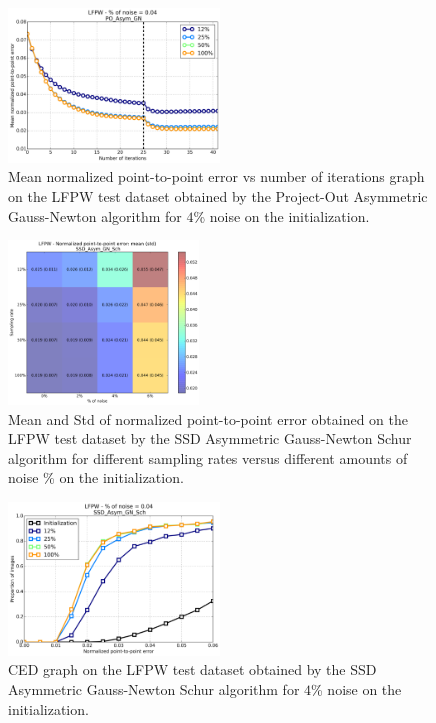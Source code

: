 \begin{figure}[h!]
    \centering
    \includegraphics[width=0.50\textwidth]{experiments/noise_vs_sampling/po_asymmetric_gn/mean_error_vs_iters_po_asymmetric_gn_4.png}
    \caption{Mean normalized point-to-point error vs number of iterations graph on the LFPW test dataset obtained by the Project-Out Asymmetric Gauss-Newton algorithm for $4$\% noise on the initialization.}
    \label{fig:mean_error_vs_iters_po_asymmetric_gn_4}
\end{figure}

\begin{figure}[h!]
    \centering
    \includegraphics[width=0.45\textwidth]{experiments/noise_vs_sampling/ssd_asymmetric_gn/noise_vs_sampling_ssd_asymmetric.png}
    \caption{Mean and Std of normalized point-to-point error obtained on the LFPW test dataset by the SSD Asymmetric Gauss-Newton Schur algorithm for different sampling rates versus different amounts of noise \% on the initialization.}
    \label{fig:noise_vs_sampling_ssd_asymmetric}
\end{figure}

\begin{figure}[h!]
    \centering
    \includegraphics[width=0.50\textwidth]{experiments/noise_vs_sampling/ssd_asymmetric_gn/ced_ssd_asymmetric_gn_4.png}
    \caption{CED graph on the LFPW test dataset obtained by the SSD Asymmetric Gauss-Newton Schur algorithm for $4$\% noise on the initialization.}
    \label{fig:ced_ssd_asymmetric_gn_4}
\end{figure}

